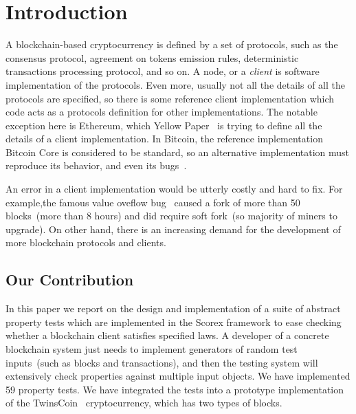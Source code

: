 
\section{Introduction}

A blockchain-based cryptocurrency is defined by a set of protocols, such as the consensus protocol, agreement on tokens emission rules, deterministic transactions processing protocol, and so on. A node, or a {\em client} is software implementation of the protocols. Even more, usually not all the details of all the protocols are specified, so there is some reference client implementation which code acts as a protocols definition for other implementations. The notable exception here is Ethereum, which Yellow Paper~\cite{ethyp} is trying to define all the details of a client implementation. In Bitcoin, the reference implementation Bitcoin Core is considered to be standard, so an alternative implementation must reproduce its behavior, and even its bugs~\cite{bitbugs}. 

An error in a client implementation would be utterly costly and hard to fix. For example,the famous value oveflow bug~\cite{overflow} caused a fork of more than 50 blocks~(more than 8 hours) and did require soft fork~(so majority of miners to upgrade). On other hand, there is an increasing demand for the development of more blockchain protocols and clients. 


\subsection{Our Contribution}

In this paper we report on the design and implementation of a suite of abstract property tests which are implemented in the Scorex framework to ease checking whether a blockchain client satisfies specified laws. A developer of a concrete blockchain system just needs to implement generators of random test inputs~(such as blocks and transactions), and then the testing system will extensively check properties against multiple input objects. We have implemented 59 property tests. We have integrated the tests into a prototype implementation of the TwinsCoin~ cryptocurrency, which has two types of blocks.  
